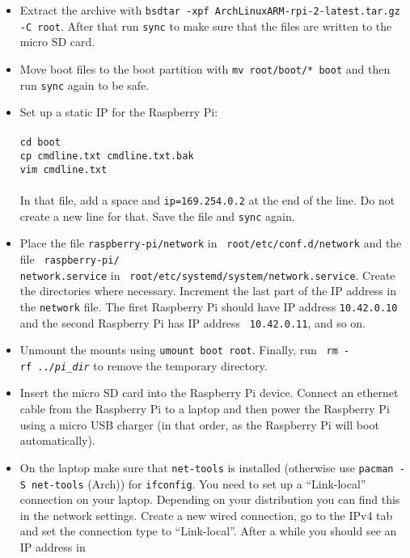 \documentclass{article}
\newcommand{\arch}{{\color{red} (Arch)}}
\begin{document}
\begin{itemize}
    \item Extract the archive with {\tt bsdtar -xpf 
          ArchLinuxARM-rpi-2-latest.tar.gz -C root}.
          After that run {\tt sync} to make sure that the files are written to 
          the micro SD card.
    \item Move boot files to the boot partition with {\tt mv root/boot/* boot} 
          and then run {\tt sync} again to be safe.
    \item Set up a static IP for the Raspberry Pi: \\\\
          {\tt cd boot} \\
          {\tt cp cmdline.txt cmdline.txt.bak} \\
          {\tt vim cmdline.txt} \\\\
          In that file, add a space and {\tt ip=169.254.0.2} at the end of the 
          line. Do not create a new line for that. Save the file and {\tt sync} 
          again.
    \item Place the file {\tt raspberry-pi/network} in {\tt 
          root/etc/conf.d/network} and the file {\tt 
          raspberry-pi/\\network.service} in {\tt 
          root/etc/systemd/system/network.service}. Create the directories 
          where necessary. Increment the last part of the IP address in the 
          {\tt network} file. The first Raspberry Pi should have IP address 
          {\tt 10.42.0.10} and the second Raspberry Pi has IP address {\tt 
          10.42.0.11}, and so on.
    \item Unmount the mounts using {\tt umount boot root}. Finally, run {\tt 
          rm -rf~../\emph{pi\_dir}} to remove the temporary directory.
    \item Insert the micro SD card into the Raspberry Pi device. Connect an 
          ethernet cable from the Raspberry Pi to a laptop and then power the 
          Raspberry Pi using a micro USB charger (in that order, as the 
          Raspberry Pi will boot automatically).
    \item On the laptop make sure that {\tt net-tools} is installed (otherwise 
          use {\tt pacman -S net-tools} \arch{}) for {\tt ifconfig}. You need 
          to set up a ``Link-local'' connection on your laptop. Depending on 
          your distribution you can find this in the network settings. Create 
          a new wired connection, go to the IPv4 tab and set the connection 
          type to ``Link-local''. After a while you should see an IP address in 

\end{itemize}
\end{document}
